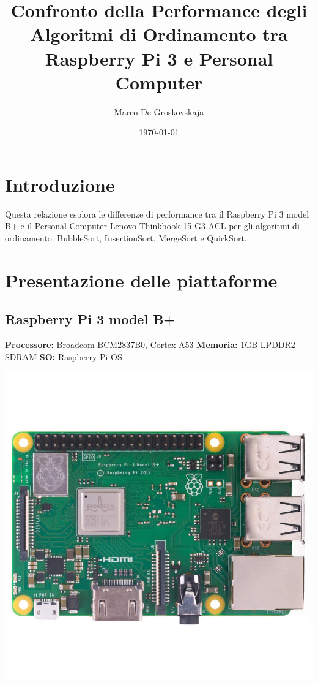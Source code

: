 \documentclass{article}
\title	{Confronto della Performance degli Algoritmi di Ordinamento tra Raspberry Pi 3 e Personal Computer}
\author	{Marco De Groskovskaja}
\date	{\today}
\begin{document}
	\maketitle
	
	\section{Introduzione}
		
		Questa relazione esplora le differenze di performance tra il Raspberry Pi 3 model B+ e il Personal Computer Lenovo Thinkbook 15 G3 ACL per gli algoritmi di ordinamento: BubbleSort, InsertionSort, MergeSort e QuickSort.
	
	\section{Presentazione delle piattaforme}
		\subsection{Raspberry Pi 3 model B+}
			\begin{minipage}{0.6\textwidth}\raggedright
				\textbf{Processore:}
				\hspace{1mm} Broadcom BCM2837B0, Cortex-A53
				\newline
				\newline
				\textbf{Memoria:}
				\hspace{4mm} 1GB LPDDR2 SDRAM
				\newline
				\newline
				\textbf{SO:}
				\hspace{15mm} Raspberry Pi OS
			\end{minipage}
			\begin{minipage}{0.3\textwidth}
				\includegraphics[width=\linewidth]{./Imgs/RaspberryBoard.jpg}
			\end{minipage}
\end{document}
